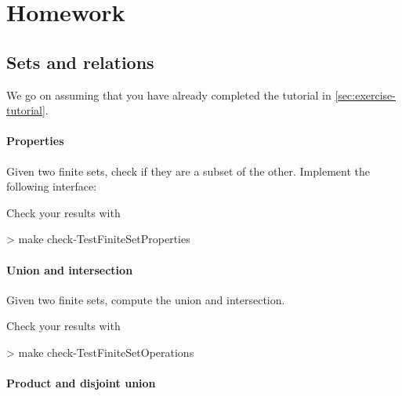 \part{Homework}




\chapter{Sets and relations}

We go on assuming that you have already completed the tutorial in \cref{sec:exercise-tutorial}.

\subsection{Properties}

\begin{exercise}
Given two finite sets, check if they are a subset of the other.
Implement the following interface:
\end{exercise}

Check your results with
\begin{console}
> make check-TestFiniteSetProperties
\end{console}

\subsection{Union and intersection}


\begin{exercise}
Given two finite sets, compute the union and intersection.
\end{exercise}


Check your results with
\begin{console}
> make check-TestFiniteSetOperations
\end{console}




\subsection{Product and disjoint union}


